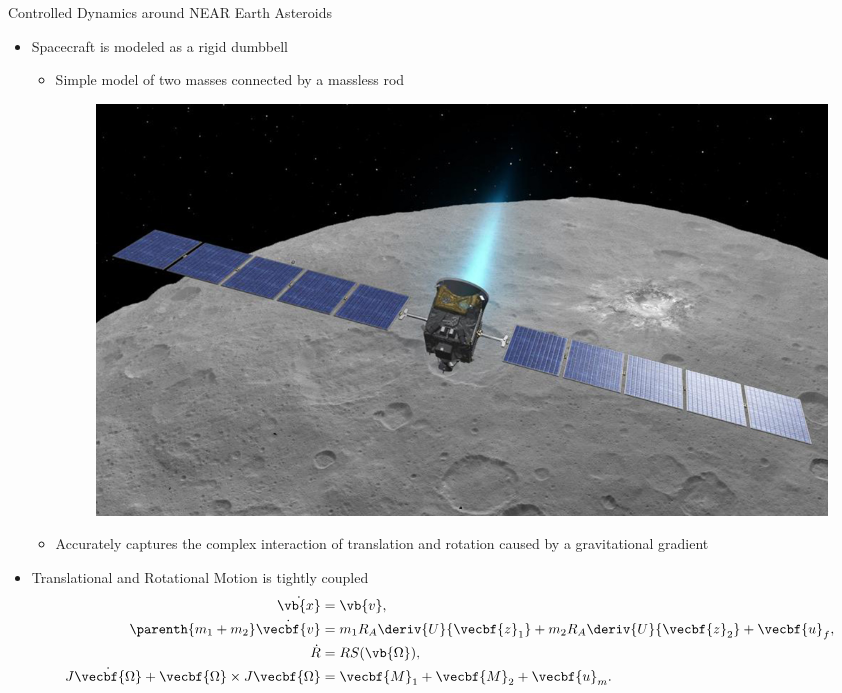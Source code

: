 \documentclass[final, usenames, dvipsnames]{beamer}
\newlength{\twocolwidth}
\begin{document}
\begin{frame}[t]
\begin{columns}[T,onlytextwidth]
\begin{column}{\twocolwidth}
\begin{block}{Controlled Dynamics around NEAR Earth Asteroids} %
	\begin{minipage}{0.5\columnwidth} %
	\begin{itemize}
            \item Spacecraft is modeled as a rigid dumbbell
                \begin{itemize}
                    \item Simple model of two masses connected by a massless rod 
                        \begin{figure}
                            \centering
                            \includegraphics[width=0.6\columnwidth]{figures/dawn.jpg}
                        \end{figure}
                    \item Accurately captures the complex interaction of translation and rotation caused by a gravitational gradient
                \end{itemize}
            \item Translational and Rotational Motion is tightly coupled
                \begin{align*}
                    \dot{\vb{x}} &= \vb{v}, \\
                    \parenth{m_1 + m_2} \dot{\vecbf{v}} &= m_1 R_A \deriv{U}{\vecbf{z}_1} + m_2 R_A \deriv{U}{\vecbf{z}_2} + \vecbf{u}_f, \\
                    \dot{R} &= R S(\vb{\Omega}) , \\
                    J \dot{\vecbf{\Omega}} + \vecbf{\Omega} \times J \vecbf{\Omega} &= \vecbf{M}_1 + \vecbf{M}_2 + \vecbf{u}_m. 
                \end{align*}


\end{itemize}
\end{minipage}
\end{block}
\end{column}
\end{columns}
\end{frame}
\end{document}
